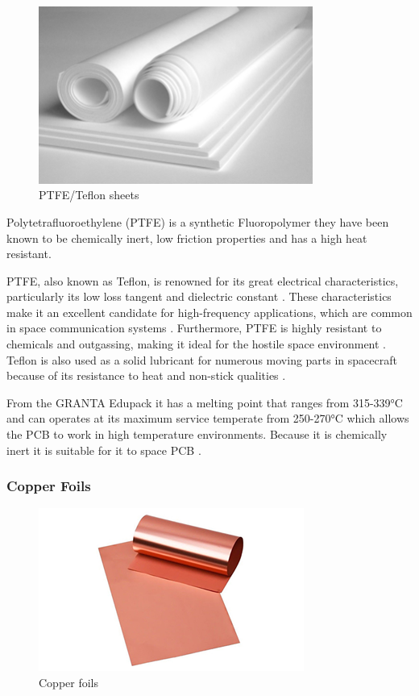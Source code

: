 \begin{figure}[htbp]
    \centering
    \includegraphics[width=9cm]{chapters/methodology/MaterialAnalysis/Fig3PTFE.png}
    \caption{PTFE/Teflon sheets \cite{RefWorks:imimg2025teflon/ptfe}}
    \label{fig:ptfe-sheets}
\end{figure}

Polytetrafluoroethylene (PTFE) is a synthetic Fluoropolymer they have been known to be chemically inert, low friction properties and has a high heat resistant.

PTFE, also known as Teflon, is renowned for its great electrical characteristics, particularly its low loss tangent and dielectric constant \cite{RefWorks:2025designing}. 
These characteristics make it an excellent candidate for high-frequency applications, which are common in space communication systems \cite{RefWorks:2025designing}. 
Furthermore, PTFE is highly resistant to chemicals and outgassing, making it ideal for the hostile space environment \cite{RefWorks:2025designing}. 
Teflon is also used as a solid lubricant for numerous moving parts in spacecraft because of its resistance to heat and non-stick qualities \cite{RefWorks:2023select}.

From the GRANTA Edupack it has a melting point that ranges from 315-339°C and can operates at its maximum service temperate from 250-270°C which allows the PCB to work in high temperature environments. 
Because it is chemically inert it is suitable for it to space PCB \cite{RefWorks:RayMingPCB2023}.

\subsubsection{Copper Foils}
\begin{figure}[htbp]
    \centering
    \includegraphics[width=8.7cm]{chapters/methodology/MaterialAnalysis/Fig4Copper.png}
    \caption{Copper foils \cite{RefWorks:solutions2022copper}}
    \label{fig:copper-foils}
\end{figure}

